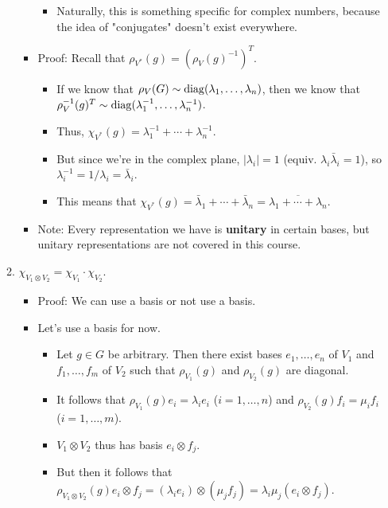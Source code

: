 \documentclass[../notes.tex]{subfiles}
\begin{document}
\begin{itemize}
\begin{enumerate}[resume]
\begin{itemize}
            \begin{itemize}
                \item Naturally, this is something specific for complex numbers, because the idea of "conjugates" doesn't exist everywhere.
            \end{itemize}
            \item Proof: Recall that $\rho_{V^*}(g)=(\rho_V(g)^{-1})^T$.
            \begin{itemize}
                \item If we know that $\rho_V(G)\sim\operatorname{diag}(\lambda_1,\dots,\lambda_n)$, then we know that $\rho_V^{-1}(g)^T\sim\operatorname{diag}(\lambda_1^{-1},\dots,\lambda_n^{-1})$.
                \item Thus, $\chi_{V^*}(g)=\lambda_1^{-1}+\cdots+\lambda_n^{-1}$.
                \item But since we're in the complex plane, $|\lambda_i|=1$ (equiv. $\lambda_i\bar{\lambda}_i=1$), so $\lambda_i^{-1}=1/\lambda_i=\bar{\lambda}_i$.
                \item This means that $\chi_{V^*}(g)=\bar{\lambda}_1+\cdots+\bar{\lambda}_n=\overline{\lambda_1+\cdots+\lambda_n}$.
            \end{itemize}
            \item Note: Every representation we have is \textbf{unitary} in certain bases, but unitary representations are not covered in this course.
        \end{itemize}
        \item $\chi_{V_1\otimes V_2}=\chi_{V_1}\cdot\chi_{V_2}$.
        \begin{itemize}
            \item Proof: We can use a basis or not use a basis.
            \item Let's use a basis for now.
            \begin{itemize}
                \item Let $g\in G$ be arbitrary. Then there exist bases $e_1,\dots,e_n$ of $V_1$ and $f_1,\dots,f_m$ of $V_2$ such that $\rho_{V_1}(g)$ and $\rho_{V_2}(g)$ are diagonal.
                \item It follows that $\rho_{V_1}(g)e_i=\lambda_ie_i$ ($i=1,\dots,n$) and $\rho_{V_2}(g)f_i=\mu_if_i$ ($i=1,\dots,m$).
                \item $V_1\otimes V_2$ thus has basis $e_i\otimes f_j$.
                \item But then it follows that $\rho_{V_1\otimes V_2}(g)e_i\otimes f_j=(\lambda_ie_i)\otimes(\mu_jf_j)=\lambda_i\mu_j(e_i\otimes f_j)$.

\end{itemize}
\end{itemize}
\end{enumerate}
\end{itemize}
\end{document}
